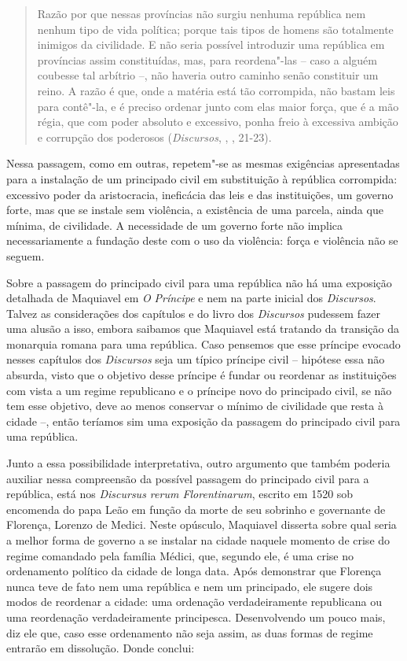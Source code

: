 \begin{quote}
Razão por que nessas províncias não surgiu nenhuma república nem nenhum
tipo de vida política; porque tais tipos de homens são totalmente
inimigos da civilidade. E não seria possível introduzir uma república em
províncias assim constituídas, mas, para reordena"-las -- caso a alguém
coubesse tal arbítrio --, não haveria outro caminho senão constituir um
reino. A razão é que, onde a matéria está tão corrompida, não bastam
leis para contê"-la, e é preciso ordenar junto com elas maior força, que
é a mão régia, que com poder absoluto e excessivo, ponha freio à
excessiva ambição e corrupção dos poderosos (\emph{Discursos}, , ,
21-23).
\end{quote}

Nessa passagem, como em outras, repetem"-se as mesmas exigências
apresentadas para a instalação de um principado civil em substituição à
república corrompida: excessivo poder da aristocracia, ineficácia das
leis e das instituições, um governo forte, mas que se instale sem
violência, a existência de uma parcela, ainda que mínima, de civilidade.
A necessidade de um governo forte não implica necessariamente a fundação
deste com o uso da violência: força e violência não se seguem.

Sobre a passagem do principado civil para uma república não há uma
exposição detalhada de Maquiavel em \emph{O} \emph{Príncipe} e nem na
parte inicial dos \emph{Discursos}. Talvez as considerações dos
capítulos  e  do livro  dos \emph{Discursos} pudessem fazer uma
alusão a isso, embora saibamos que Maquiavel está tratando da transição
da monarquia romana para uma república. Caso pensemos que esse príncipe
evocado nesses capítulos dos \emph{Discursos} seja um típico príncipe
civil -- hipótese essa não absurda, visto que o objetivo desse príncipe
é fundar ou reordenar as instituições com vista a um regime republicano
e o príncipe novo do principado civil, se não tem esse objetivo, deve ao
menos conservar o mínimo de civilidade que resta à cidade --, então
teríamos sim uma exposição da passagem do principado civil para uma
república.

Junto a essa possibilidade interpretativa, outro argumento que também
poderia auxiliar nessa compreensão da possível passagem do principado
civil para a república, está nos \emph{Discursus rerum Florentinarum},
escrito em 1520 sob encomenda do papa Leão  em função da morte de seu
sobrinho e governante de Florença, Lorenzo de Medici. Neste opúsculo,
Maquiavel disserta sobre qual seria a melhor forma de governo a se
instalar na cidade naquele momento de crise do regime comandado pela
família Médici, que, segundo ele, é uma crise no ordenamento político da
cidade de longa data. Após demonstrar que Florença nunca teve de fato
nem uma república e nem um principado, ele sugere dois modos de
reordenar a cidade: uma ordenação verdadeiramente republicana ou uma
reordenação verdadeiramente principesca. Desenvolvendo um pouco mais,
diz ele que, caso esse ordenamento não seja assim, as duas formas de
regime entrarão em dissolução. Donde conclui:

